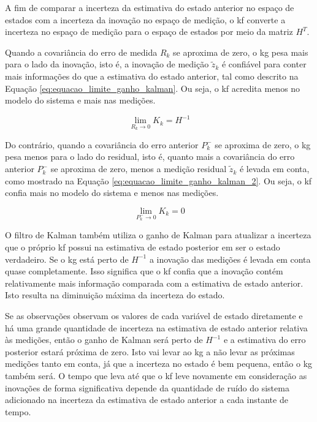 \documentclass[acronym, symbols]{fei}
\begin{document}
				A fim de comparar a incerteza da estimativa do estado anterior no espaço de estados com a incerteza da inovação no espaço de medição, o \acrshort{kf} converte a incerteza no espaço de medição para o espaço de estados por meio da matriz $H^T$.
				
				Quando a covariância do erro de medida $R_k$ se aproxima de zero, o \acrshort{kg} pesa mais para o lado da inovação, isto é, a inovação de medição $\tilde{z}_k$ é confiável para conter mais informações do que a estimativa do estado anterior, tal como descrito na Equação \eqref{eq:equacao_limite_ganho_kalman}. Ou seja, o \acrshort{kf} acredita menos no modelo do sistema e mais nas medições.
				
				\begin{equation} \label{eq:equacao_limite_ganho_kalman}
					\lim_{R_k \rightarrow 0 }K_k = H^{-1}
				\end{equation}
			
				Do contrário, quando a covariância do erro anterior $P^{-}_k$ se aproxima de zero, o \acrshort{kg} pesa menos para o lado do residual, isto é, quanto mais a covariância do erro anterior $P^{-}_k$ se aproxima de zero, menos a medição residual $\tilde{z}_k$ é levada em conta, como mostrado na Equação \eqref{eq:equacao_limite_ganho_kalman_2}. Ou seja, o \acrshort{kf} confia mais no modelo do sistema e menos nas medições.
				
				\begin{equation} \label{eq:equacao_limite_ganho_kalman_2}
					\lim_{P^{-}_k \rightarrow 0 }K_k = 0
				\end{equation}
			
				O filtro de Kalman também utiliza o ganho de Kalman para atualizar a incerteza que o próprio \acrshort{kf} possui na estimativa de estado posterior em ser o estado verdadeiro. Se o \acrshort{kg} está perto de $H^{-1}$ a inovação das medições é levada em conta quase completamente. Isso significa que o \acrshort{kf} confia que a inovação contém relativamente mais informação comparada com a estimativa de estado anterior. Isto resulta na diminuição máxima da incerteza do estado.
				
				Se as observações observam os valores de cada variável de estado diretamente e há uma grande quantidade de incerteza na estimativa de estado anterior relativa às medições, então o ganho de Kalman será perto de $H^{-1}$ e a estimativa do erro posterior estará próxima de zero. Isto vai levar ao \acrshort{kg} a não levar as próximas medições tanto em conta, já que a incerteza no estado é bem pequena, então o \acrshort{kg} também será. O tempo que leva até que o \acrshort{kf} leve novamente em consideração as inovações de forma significativa depende da quantidade de ruído do sistema adicionado na incerteza da estimativa de estado anterior a cada instante de tempo.
				
\end{document}
